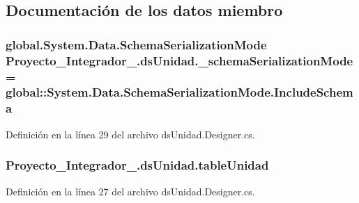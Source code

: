 \subsection{Documentación de los datos miembro}
\hypertarget{class_proyecto___integrador__3_1_1ds_unidad_a7ff1a6a5ace8cb74effc4d302dfe4039}{
\subsubsection[{\-\_\-schema\-Serialization\-Mode}]{\setlength{\rightskip}{0pt plus 5cm}global.\-System.\-Data.\-Schema\-Serialization\-Mode Proyecto\-\_\-\-Integrador\-\_.\-ds\-Unidad.\-\_\-schema\-Serialization\-Mode = global\-::\-System.\-Data.\-Schema\-Serialization\-Mode.\-Include\-Schema\hspace{0.3cm}{\ttfamily [private]}}}\label{class_proyecto___integrador__3_1_1ds_unidad_a7ff1a6a5ace8cb74effc4d302dfe4039}


Definición en la línea 29 del archivo ds\-Unidad.\-Designer.\-cs.

\hypertarget{class_proyecto___integrador__3_1_1ds_unidad_a32b0791208b2679b9dee83455af6ff07}{
\subsubsection[{table\-Unidad}]{ Proyecto\-\_\-\-Integrador\-\_.\-ds\-Unidad.\-table\-Unidad\hspace{0.3cm}{\ttfamily [private]}}}\label{class_proyecto___integrador__3_1_1ds_unidad_a32b0791208b2679b9dee83455af6ff07}


Definición en la línea 27 del archivo ds\-Unidad.\-Designer.\-cs.



